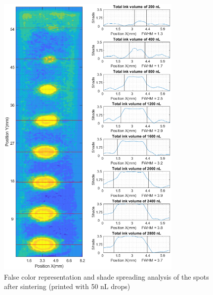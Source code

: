 \begin{figure}[H]
	\centering
	\includegraphics[width=0.8\textwidth]{grafiken/drops50.eps}
	\caption{False color representation and shade spreading analysis of the spots after sintering (printed with 50 nL drops)}
	\label{fig:drops50}
\end{figure} 

\bigskip 


